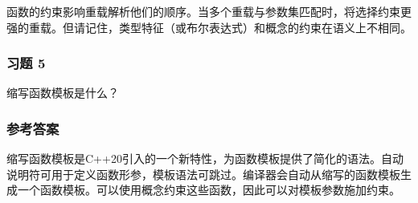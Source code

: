 函数的约束影响重载解析他们的顺序。当多个重载与参数集匹配时，将选择约束更强的重载。但请记住，类型特征（或布尔表达式）和概念的约束在语义上不相同。

\subsubsection{习题 5}

缩写函数模板是什么？

\subsubsection{参考答案}

缩写函数模板是C++20引入的一个新特性，为函数模板提供了简化的语法。自动说明符可用于定义函数形参，模板语法可跳过。编译器会自动从缩写的函数模板生成一个函数模板。可以使用概念约束这些函数，因此可以对模板参数施加约束。












